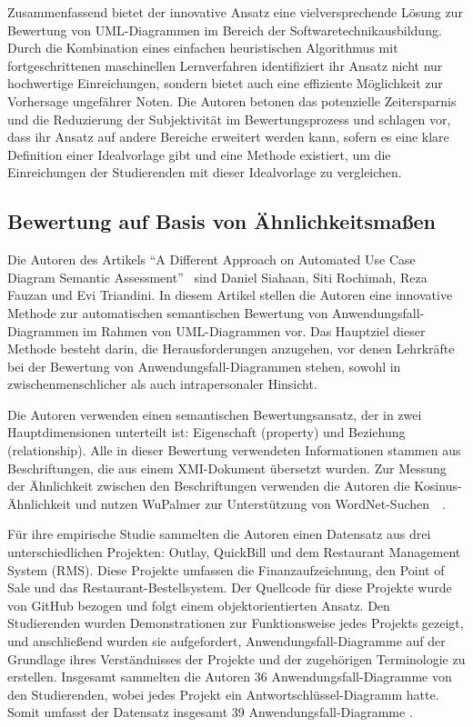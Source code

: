 Zusammenfassend bietet der innovative Ansatz eine vielversprechende Lösung zur Bewertung von UML-Diagrammen im Bereich der Softwaretechnikausbildung. Durch die Kombination eines einfachen heuristischen Algorithmus mit fortgeschrittenen maschinellen Lernverfahren identifiziert ihr Ansatz nicht nur hochwertige Einreichungen, sondern bietet auch eine effiziente Möglichkeit zur Vorhersage ungefährer Noten. Die Autoren betonen das potenzielle Zeitersparnis und die Reduzierung der Subjektivität im Bewertungsprozess und schlagen vor, dass ihr Ansatz auf andere Bereiche erweitert werden kann, sofern es eine klare Definition einer Idealvorlage gibt und eine Methode existiert, um die Einreichungen der Studierenden mit dieser Idealvorlage zu vergleichen.


\subsection{Bewertung auf Basis von Ähnlichkeitsmaßen}

Die Autoren des Artikels ``A Different Approach on Automated Use Case Diagram Semantic Assessment''~\cite{fauzan2021different} sind Daniel Siahaan, Siti Rochimah, Reza Fauzan und Evi Triandini. In diesem Artikel stellen die Autoren eine innovative Methode zur automatischen semantischen Bewertung von Anwendungsfall-Diagrammen im Rahmen von UML-Diagrammen vor. Das Hauptziel dieser Methode besteht darin, die Herausforderungen anzugehen, vor denen Lehrkräfte bei der Bewertung von Anwendungsfall-Diagrammen stehen, sowohl in zwischenmenschlicher als auch intrapersonaler Hinsicht.

Die Autoren verwenden einen semantischen Bewertungsansatz, der in zwei Hauptdimensionen unterteilt ist: Eigenschaft (property) und Beziehung (relationship). Alle in dieser Bewertung verwendeten Informationen stammen aus Beschriftungen, die aus einem \ac{XMI}-Dokument \cite{xmi} übersetzt wurden. Zur Messung der Ähnlichkeit zwischen den Beschriftungen verwenden die Autoren die Kosinus-Ähnlichkeit und nutzen WuPalmer zur Unterstützung von WordNet-Suchen~\cite{fauzan2021different}~\cite{al2017matching}.

Für ihre empirische Studie sammelten die Autoren einen Datensatz aus drei unterschiedlichen Projekten: Outlay, QuickBill und dem Restaurant Management System (RMS). Diese Projekte umfassen die Finanzaufzeichnung, den Point of Sale und das Restaurant-Bestellsystem. Der Quellcode für diese Projekte wurde von GitHub bezogen und folgt einem objektorientierten Ansatz. Den Studierenden wurden Demonstrationen zur Funktionsweise jedes Projekts gezeigt, und anschließend wurden sie aufgefordert, Anwendungsfall-Diagramme auf der Grundlage ihres Verständnisses der Projekte und der zugehörigen Terminologie zu erstellen. Insgesamt sammelten die Autoren 36 Anwendungsfall-Diagramme von den Studierenden, wobei jedes Projekt ein Antwortschlüssel-Diagramm hatte. Somit umfasst der Datensatz insgesamt 39 Anwendungsfall-Diagramme \cite{fauzan2021different}.

